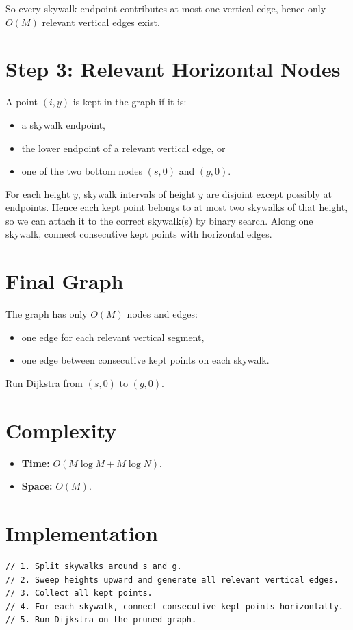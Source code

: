 \documentclass[11pt,a4paper]{article}
\begin{document}
So every skywalk endpoint contributes at most one vertical edge, hence only $O(M)$ relevant
vertical edges exist.

\section{Step 3: Relevant Horizontal Nodes}
A point $(i,y)$ is kept in the graph if it is:
\begin{itemize}
  \item a skywalk endpoint,
  \item the lower endpoint of a relevant vertical edge, or
  \item one of the two bottom nodes $(s,0)$ and $(g,0)$.
\end{itemize}

For each height $y$, skywalk intervals of height $y$ are disjoint except possibly at endpoints.
Hence each kept point belongs to at most two skywalks of that height, so we can attach it to the
correct skywalk(s) by binary search.
Along one skywalk, connect consecutive kept points with horizontal edges.

\section{Final Graph}
The graph has only $O(M)$ nodes and edges:
\begin{itemize}
  \item one edge for each relevant vertical segment,
  \item one edge between consecutive kept points on each skywalk.
\end{itemize}
Run Dijkstra from $(s,0)$ to $(g,0)$.

\section{Complexity}
\begin{itemize}
  \item \textbf{Time:} $O(M \log M + M \log N)$.
  \item \textbf{Space:} $O(M)$.
\end{itemize}

\section{Implementation}
\begin{lstlisting}
// 1. Split skywalks around s and g.
// 2. Sweep heights upward and generate all relevant vertical edges.
// 3. Collect all kept points.
// 4. For each skywalk, connect consecutive kept points horizontally.
// 5. Run Dijkstra on the pruned graph.
\end{lstlisting}
\end{document}
